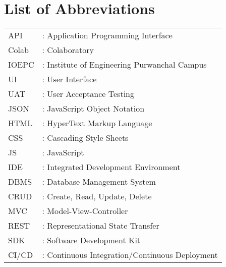 \newpage
\chapter*{List of Abbreviations}
\begin{tabular}{l l}
API	&	:	Application Programming Interface	\\
Colab	&	:	Colaboratory	\\
IOEPC	&	:	Institute of Engineering Purwanchal Campus	\\
UI	&	:	User Interface	\\
UAT	&	:	User Acceptance Testing	\\
JSON	&	:	JavaScript Object Notation	\\
HTML	&	:	HyperText Markup Language	\\
CSS	&	:	Cascading Style Sheets	\\
JS	&	:	JavaScript	\\
IDE	&	:	Integrated Development Environment	\\
DBMS	&	:	Database Management System	\\
CRUD	&	:	Create, Read, Update, Delete	\\
MVC	&	:	Model-View-Controller	\\
REST	&	:	Representational State Transfer	\\
SDK	&	:	Software Development Kit	\\
CI/CD	&	:	Continuous Integration/Continuous Deployment	\\
\end{tabular}